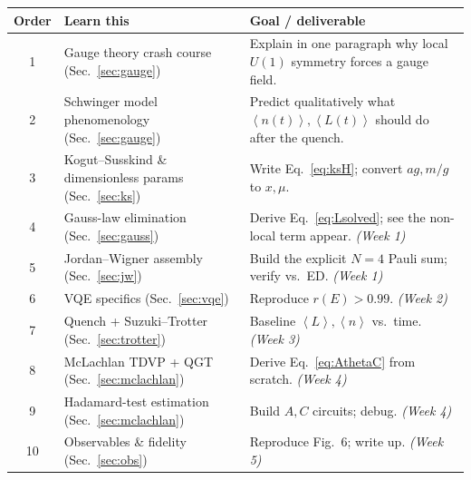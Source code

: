 \documentclass[11pt,a4paper]{article}
\newcommand{\ev}[1]{\left\langle#1\right\rangle}
\begin{document}
\begin{center}
\renewcommand{\arraystretch}{1.3}
\begin{longtable}{c >{\raggedright\arraybackslash}p{} >{\raggedright\arraybackslash}p{}}
\toprule
\textbf{Order} & \textbf{Learn this} & \textbf{Goal / deliverable} \\
\midrule\endhead
1 & Gauge theory crash course (Sec.~\ref{sec:gauge}) & Explain in one paragraph why local $U(1)$ symmetry forces a gauge field. \\
2 & Schwinger model phenomenology (Sec.~\ref{sec:gauge}) & Predict qualitatively what $\ev{n(t)},\ev{L(t)}$ should do after the quench. \\
3 & Kogut--Susskind \& dimensionless params (Sec.~\ref{sec:ks}) & Write Eq.~\eqref{eq:ksH}; convert $ag,m/g$ to $x,\mu$. \\
4 & Gauss-law elimination (Sec.~\ref{sec:gauss}) & Derive Eq.~\eqref{eq:Lsolved}; see the non-local term appear. \emph{(Week 1)} \\
5 & Jordan--Wigner assembly (Sec.~\ref{sec:jw}) & Build the explicit $N{=}4$ Pauli sum; verify vs.\ ED. \emph{(Week 1)} \\
6 & VQE specifics (Sec.~\ref{sec:vqe}) & Reproduce $r(E)>0.99$. \emph{(Week 2)} \\
7 & Quench + Suzuki--Trotter (Sec.~\ref{sec:trotter}) & Baseline $\ev{L},\ev{n}$ vs.\ time. \emph{(Week 3)} \\
8 & McLachlan TDVP + QGT (Sec.~\ref{sec:mclachlan}) & Derive Eq.~\eqref{eq:AthetaC} from scratch. \emph{(Week 4)} \\
9 & Hadamard-test estimation (Sec.~\ref{sec:mclachlan}) & Build $A,C$ circuits; debug. \emph{(Week 4)} \\
10 & Observables \& fidelity (Sec.~\ref{sec:obs}) & Reproduce Fig.~6; write up. \emph{(Week 5)} \\
\bottomrule
\end{longtable}
\end{center}
\end{document}
